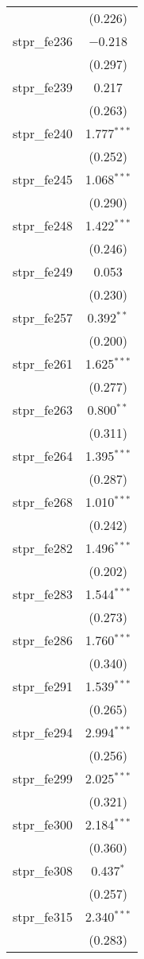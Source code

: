 \begin{table}[!htbp]
\begin{tabular}{@{\extracolsep{5pt}}lc}
  & (0.226) \\ 
  stpr\_fe236 & $-$0.218 \\ 
  & (0.297) \\ 
  stpr\_fe239 & 0.217 \\ 
  & (0.263) \\ 
  stpr\_fe240 & 1.777$^{***}$ \\ 
  & (0.252) \\ 
  stpr\_fe245 & 1.068$^{***}$ \\ 
  & (0.290) \\ 
  stpr\_fe248 & 1.422$^{***}$ \\ 
  & (0.246) \\ 
  stpr\_fe249 & 0.053 \\ 
  & (0.230) \\ 
  stpr\_fe257 & 0.392$^{**}$ \\ 
  & (0.200) \\ 
  stpr\_fe261 & 1.625$^{***}$ \\ 
  & (0.277) \\ 
  stpr\_fe263 & 0.800$^{**}$ \\ 
  & (0.311) \\ 
  stpr\_fe264 & 1.395$^{***}$ \\ 
  & (0.287) \\ 
  stpr\_fe268 & 1.010$^{***}$ \\ 
  & (0.242) \\ 
  stpr\_fe282 & 1.496$^{***}$ \\ 
  & (0.202) \\ 
  stpr\_fe283 & 1.544$^{***}$ \\ 
  & (0.273) \\ 
  stpr\_fe286 & 1.760$^{***}$ \\ 
  & (0.340) \\ 
  stpr\_fe291 & 1.539$^{***}$ \\ 
  & (0.265) \\ 
  stpr\_fe294 & 2.994$^{***}$ \\ 
  & (0.256) \\ 
  stpr\_fe299 & 2.025$^{***}$ \\ 
  & (0.321) \\ 
  stpr\_fe300 & 2.184$^{***}$ \\ 
  & (0.360) \\ 
  stpr\_fe308 & 0.437$^{*}$ \\ 
  & (0.257) \\ 
  stpr\_fe315 & 2.340$^{***}$ \\ 
  & (0.283) \\ 

\end{tabular}
\end{table}
